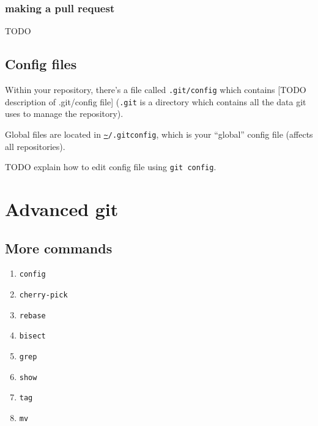 \documentclass[12pt]{article}
\newcommand{\urlwofont}[1]{\urlstyle{same}\url{#1}}
\begin{document}
\subsubsection{making a pull request}
TODO

\subsection{Config files}
Within your repository, there's a file called \texttt{.git/config} which contains [TODO description of .git/config file] (\texttt{.git} is a directory which contains all the data git uses to manage the repository).

Global files are located in \texttt{\urlwofont{~}/.gitconfig}, which is your ``global'' config file (affects all repositories).

TODO explain how to edit config file using \texttt{git config}.

\section{Advanced git}

\subsection{More commands}
\begin{enumerate}

\item{\texttt{config}}

\item{\texttt{cherry-pick}}

\item{\texttt{rebase}}

\item{\texttt{bisect}}

\item{\texttt{grep}}

\item{\texttt{show}}

\item{\texttt{tag}}

\item{\texttt{mv}}

\end{enumerate}
\end{document}
